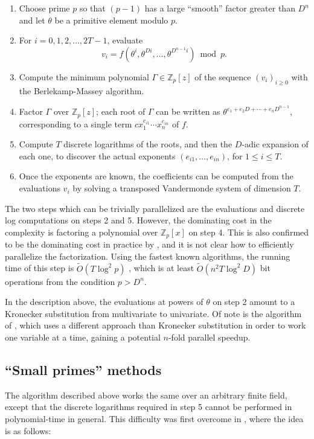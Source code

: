 \documentclass[letterpaper,10pt]{article}
\def\cite{\citep}
\newcommand{\ZZ}{\ensuremath{\mathbb{Z}}}
\newcommand{\softoh}{\ensuremath{\widetilde{O}}}
\begin{document}
\begin{enumerate}
  \item Choose prime $p$ so that $(p-1)$ has a large ``smooth''
    factor greater than $D^n$ and let $\theta$ be a primitive element
    modulo $p$.
  \item For $i=0,1,2,\ldots,2T-1$, evaluate
    \[v_i = f(\theta^i, \theta^{Di}, \ldots, \theta^{D^{n-1}i}) \bmod p.\]
  \item Compute the minimum polynomial $\Gamma\in\ZZ_p[z]$ of the 
    sequence $(v_i)_{i\ge 0}$ with the Berlekamp-Massey algorithm.
  \item Factor $\Gamma$ over $\ZZ_p[z]$; each root of $\Gamma$ can be
    written as
    $\theta^{e_1 + e_2 D + \cdots + e_n D^{n-1}}$, corresponding to
    a single term $c x_1^{e_{i1}}\cdots x_n^{e_{in}}$ of $f$.
  \item Compute $T$ discrete logarithms of the roots, and then the
    $D$-adic expansion of each one, to discover the actual exponents
    $(e_{i1},\ldots,e_{in})$, for $1\le i\le T$.
  \item Once the exponents are known, the coefficients can be computed
    from the evaluations $v_i$ by solving a transposed
    Vandermonde system of dimension $T$.
\end{enumerate}

The two steps which can be trivially parallelized are the evaluations
and discrete log computations on steps 2 and 5. However, the dominating
cost in the complexity is factoring a polynomial over $\ZZ_p[x]$ on step
4. This is also confirmed to be the dominating cost in practice by
\cite{HL15}, and it is not clear how to efficiently parallelize the
factorization. Using the fastest known algorithms, the running time of
this step is $\softoh(T\log^2 p)$ \cite{GHL15}, which is at least 
$\softoh(n^2 T \log^2 D)$ bit operations from the condition
$p > D^n$.

In the description above, the evaluations at powers of $\theta$ on step 2 amount to a
Kronecker substitution from multivariate to univariate. Of note is
the algorithm of \cite{JM10}, which uses a different approach than
Kronecker substitution in order to work one variable at a time, gaining
a potential $n$-fold parallel speedup.

\subsection{``Small primes'' methods}

The algorithm described above works the same over an arbitrary finite
field, except that the discrete logarithms required in step 5 cannot be
performed in polynomial-time in general. This difficulty was first
overcome in \cite{GS09}, where the idea is as follows:
\end{document}
